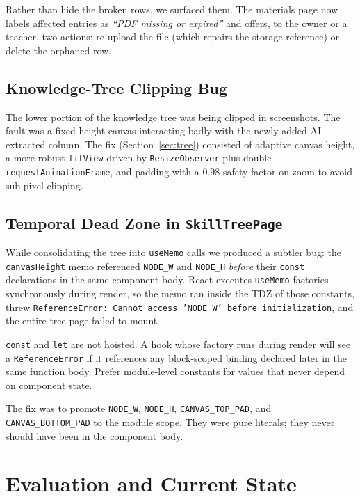 \documentclass[11pt,a4paper]{article}
\newcommand{\code}[1]{\texttt{\small #1}}
\begin{document}
Rather than hide the broken rows, we surfaced them. The materials page now labels affected entries as \emph{``PDF missing or expired''} and offers, to the owner or a teacher, two actions: re-upload the file (which repairs the storage reference) or delete the orphaned row.

\subsection{Knowledge-Tree Clipping Bug}

The lower portion of the knowledge tree was being clipped in screenshots. The fault was a fixed-height canvas interacting badly with the newly-added AI-extracted column. The fix (Section~\ref{sec:tree}) consisted of adaptive canvas height, a more robust \code{fitView} driven by \code{ResizeObserver} plus double-\code{requestAnimationFrame}, and padding with a $0.98$ safety factor on zoom to avoid sub-pixel clipping.

\subsection{Temporal Dead Zone in \code{SkillTreePage}}

While consolidating the tree into \code{useMemo} calls we produced a subtler bug: the \code{canvasHeight} memo referenced \code{NODE\_W} and \code{NODE\_H} \emph{before} their \code{const} declarations in the same component body. React executes \code{useMemo} factories synchronously during render, so the memo ran inside the TDZ of those constants, threw \code{ReferenceError: Cannot access 'NODE\_W' before initialization}, and the entire tree page failed to mount.

\begin{tcolorbox}[pitfall,title=Pitfall: Hooks in the Temporal Dead Zone]
\code{const} and \code{let} are not hoisted. A hook whose factory runs during render will see a \code{ReferenceError} if it references any block-scoped binding declared later in the same function body. Prefer module-level constants for values that never depend on component state.
\end{tcolorbox}

The fix was to promote \code{NODE\_W}, \code{NODE\_H}, \code{CANVAS\_TOP\_PAD}, and \code{CANVAS\_BOTTOM\_PAD} to the module scope. They were pure literals; they never should have been in the component body.

\section{Evaluation and Current State}
\end{document}
